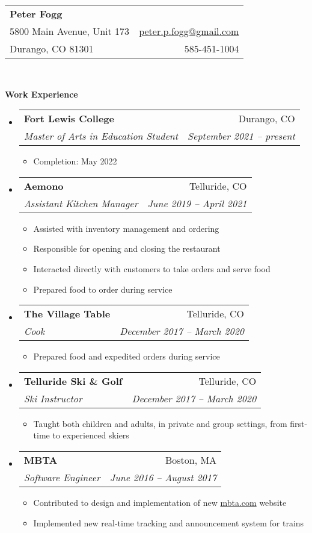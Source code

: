 \documentclass[letterpaper,11pt]{article}
\makeatletter
\newcommand{\resitem}[1]{\item #1 \vspace{-2pt}}
\newcommand{\resheading}[1]{{\large{\begin{minipage}{\textwidth}{\textbf{#1\vphantom{p\^{E}}}}\end{minipage}}}}
\newcommand{\ressubheading}[4]{
  \begin{tabular*}{6.5in}{l@{\extracolsep{\fill}}r}
    \textbf{#1} & #2 \\
    \textit{#3} & \textit{#4} \\
  \end{tabular*}\vspace{-6pt}}
\makeatother
\begin{document}
\newcommand{\mywebheader}{
  \begin{tabular*}{7in}{l@{\extracolsep{\fill}}r}
    \textbf{\LARGE Peter Fogg} & \\
    5800 Main Avenue, Unit 173 &  \href{mailto:peter.p.fogg@gmail.com}{peter.p.fogg@gmail.com} \\
    Durango, CO 81301 & 585-451-1004
  \end{tabular*}
  \\
  \vspace{0.1in}}

\mywebheader

\resheading{Work Experience}
\begin{itemize}
\item
  \ressubheading{Fort Lewis College}{Durango, CO}{Master of Arts in Education Student}{September 2021 -- present}
  \begin{itemize}
    \resitem{Completion: May 2022}
  \end{itemize}
\item
  \ressubheading{Aemono}{Telluride, CO}{Assistant Kitchen Manager}{June 2019 -- April 2021}
  \begin{itemize}
    \resitem{Assisted with inventory management and ordering}
    \resitem{Responsible for opening and closing the restaurant}
    \resitem{Interacted directly with customers to take orders and serve food}
    \resitem{Prepared food to order during service}
  \end{itemize}
\item
  \ressubheading{The Village Table}{Telluride, CO}{Cook}{December 2017 -- March 2020}
  \begin{itemize}
    \resitem{Prepared food and expedited orders during service}
  \end{itemize}
\item
  \ressubheading{Telluride Ski \& Golf}{Telluride, CO}{Ski Instructor}{December 2017 -- March 2020}
  \begin{itemize}
    \resitem{Taught both children and adults, in private and group settings, from first-time to experienced skiers}
  \end{itemize}
\item
  \ressubheading{MBTA}{Boston, MA}{Software Engineer}{June 2016 -- August 2017}
  \begin{itemize}
    \resitem{Contributed to design and implementation of new \href{https://mbta.com/}{mbta.com} website}
    \resitem{Implemented new real-time tracking and announcement system for trains}
  \end{itemize}

\end{itemize}
\end{document}
